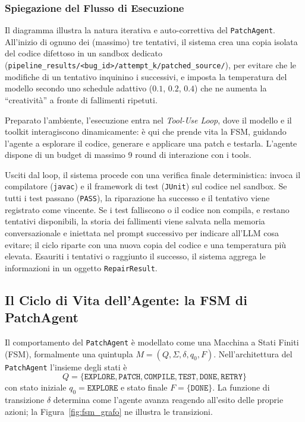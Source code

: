 \subsubsection{Spiegazione del Flusso di Esecuzione}
\label{subsubsec:3.4.1.1}
Il diagramma illustra la natura iterativa e auto-correttiva
del \texttt{PatchAgent}. All'inizio di ognuno dei (massimo) tre tentativi,
il sistema crea una copia isolata del codice difettoso in un sandbox
dedicato (\texttt{pipeline\_results/<bug\_id>/attempt\_k/patched\_source/}), per
evitare che le modifiche di un tentativo inquinino i successivi, e imposta
la temperatura del modello secondo uno schedule adattivo ($0.1$, $0.2$, $0.4$)
che ne aumenta la ``creatività'' a fronte di fallimenti ripetuti.

Preparato l'ambiente, l'esecuzione entra nel \textit{Tool-Use Loop}, dove il
modello e il toolkit interagiscono dinamicamente: è qui che prende vita la FSM,
guidando l'agente a esplorare il codice, generare e applicare una patch e
testarla. L'agente dispone di un budget di massimo 9 round di interazione con i tools.

Usciti dal loop, il sistema procede con una verifica finale deterministica:
invoca il compilatore (\texttt{javac}) e il framework di test (\texttt{JUnit})
sul codice nel sandbox. Se tutti i test passano (\texttt{PASS}), la riparazione
ha successo e il tentativo viene registrato come vincente. Se i test falliscono
o il codice non compila, e restano tentativi disponibili, la storia dei
fallimenti viene salvata nella memoria conversazionale e iniettata nel prompt
successivo per indicare all'LLM cosa evitare; il ciclo riparte con una nuova
copia del codice e una temperatura più elevata. Esauriti i tentativi o raggiunto
il successo, il sistema aggrega le informazioni in un oggetto \texttt{RepairResult}.

\clearpage
\subsection{Il Ciclo di Vita dell'Agente: la FSM di PatchAgent}
\label{subsec:3.4.2}

\label{subsubsec:3.4.2.1}
Il comportamento del \texttt{PatchAgent} è modellato come una Macchina a Stati Finiti (FSM), formalmente una
quintupla $M = (Q, \Sigma, \delta, q_0, F)$. Nell'architettura del \texttt{PatchAgent} l'insieme degli stati è
\[
    Q = \{\texttt{EXPLORE}, \texttt{PATCH}, \texttt{COMPILE}, \texttt{TEST}, \texttt{DONE}, \texttt{RETRY}\}
\]
con stato iniziale $q_0 = \texttt{EXPLORE}$ e stato finale $F = \{\texttt{DONE}\}$. La funzione di transizione
$\delta$ determina come l'agente avanza reagendo all'esito delle proprie azioni; la
Figura~\ref{fig:fsm_grafo} ne illustra le transizioni.

